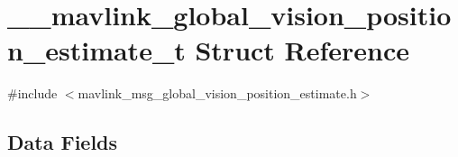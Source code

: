 \hypertarget{struct____mavlink__global__vision__position__estimate__t}{\section{\+\_\+\+\_\+mavlink\+\_\+global\+\_\+vision\+\_\+position\+\_\+estimate\+\_\+t Struct Reference}
\label{struct____mavlink__global__vision__position__estimate__t}
}


{\ttfamily \#include $<$mavlink\+\_\+msg\+\_\+global\+\_\+vision\+\_\+position\+\_\+estimate.\+h$>$}

\subsection*{Data Fields}
